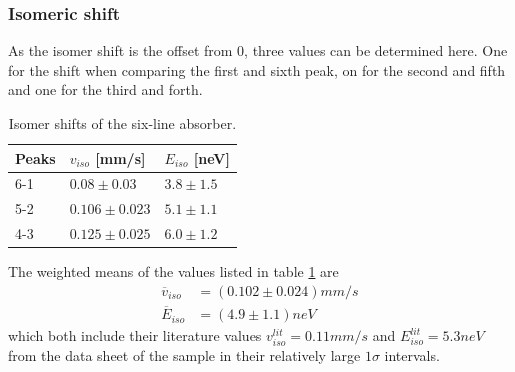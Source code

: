 \subsubsection{Isomeric shift}
As the isomer shift is the offset from 0, three values can be determined here. One for the shift when comparing the first and sixth peak, on for the second and fifth and one for the third and forth. 
\begin{table}\centering
	\begin{tabular}{@{}lll@{}}
		\toprule
		Peaks & $v_{iso}$ [mm/s]&$E_{iso}$ [neV]\\
		\midrule
		6-1 & $0.08\pm0.03$ & $3.8\pm1.5$ \\
		5-2 & $0.106\pm0.023$ & $5.1\pm1.1$ \\
		4-3 & $0.125\pm0.025$ & $6.0\pm1.2$ \\
		\bottomrule
	\end{tabular}
	\caption[Six-line absorber: Isomer shift]{Isomer shifts of the six-line absorber.}
	\label{tb:isomershifts}
\end{table}
The weighted means of the values listed in table \ref{tb:isomershifts} are
\begin{align}
\overline{v}_{iso}&=\unit{(0.102\pm0.024)}{mm/s}\\
\overline{E}_{iso}&=\unit{(4.9\pm1.1)}{neV}
\end{align}
which both include their literature values $v_{iso}^{lit}=\unit{0.11}{mm/s}$ and $E_{iso}^{lit}=\unit{5.3}{neV}$ from the data sheet of the sample in their relatively large $1\sigma$ intervals.

